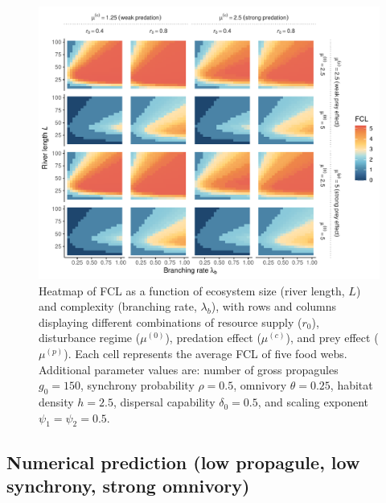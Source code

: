 \begin{figure}
\centering
\includegraphics{../data_fmt/fig_rho05_g150_theta025.pdf}
\caption{Heatmap of FCL as a function of ecosystem size (river length,
\(L\)) and complexity (branching rate, \(\lambda_b\)), with rows and
columns displaying different combinations of resource supply (\(r_0\)),
disturbance regime (\(\mu^{(0)}\)), predation effect (\(\mu^{(c)}\)),
and prey effect (\(\mu^{(p)}\)). Each cell represents the average FCL of
five food webs. Additional parameter values are: number of gross
propagules \(g_0=150\), synchrony probability \(\rho=0.5\), omnivory
\(\theta=0.25\), habitat density \(h=2.5\), dispersal capability
\(\delta_0=0.5\), and scaling exponent \(\psi_1=\psi_2=0.5\).}
\end{figure}

\newpage

\subsection*{Numerical prediction (low propagule, low synchrony, strong
omnivory)}\label{numerical-prediction-low-propagule-low-synchrony-strong-omnivory}

